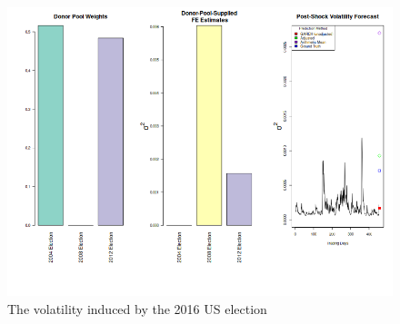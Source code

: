 \documentclass[11pt]{article}
\theoremstyle{definition}
\begin{document}
\begin{figure}[h!]
\begin{center}
  \includegraphics[scale=.5]{real_data_output_plots/savetime_WedJan1010:56:32PM2024_IYG_CL=F-^VIX-^IRX-^FVX-^TNX-^TYX_^VIX_2016-11-08-2004-11-02-2008-11-04-2012-11-06.png}
  \caption{The volatility induced by the 2016 US election}
  \label{fig:SVF_2016}
  \end{center}
\end{figure}
\end{document}
